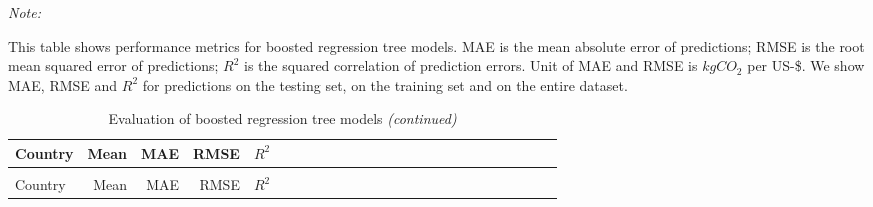 \begingroup\fontsize{8}{10}\selectfont

\begin{ThreePartTable}
\begin{TableNotes}
\item \textit{Note: } 
\item This table shows performance metrics for boosted regression tree models. MAE is the mean absolute error of predictions; RMSE is the root mean squared error of predictions; $R^{2}$ is the squared correlation of prediction errors. Unit of MAE and RMSE is $kgCO_{2}$ per US-\$. We show MAE, RMSE and $R^{2}$ for predictions on the testing set, on the training set and on the entire dataset. 
\end{TableNotes}
\begin{longtable}[t]{l|r|rrrl|r|rrrl|r|rrrl|r|rrrl|r|rrr}
\caption{Evaluation of boosted regression tree models}\\
\toprule
Country & Mean & MAE & RMSE & $R^{2}$\\
\midrule
\endfirsthead
\caption[]{Evaluation of boosted regression tree models \textit{(continued)}}\\
\toprule
Country & Mean & MAE & RMSE & $R^{2}$\\
\midrule
\endhead


\end{longtable}
\end{ThreePartTable}

